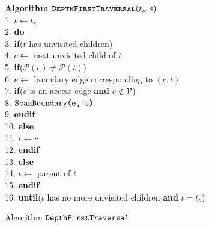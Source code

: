 {\begin{figure}[h]
{\begin{minipage}{0.90\linewidth}
  \textbf{Algorithm $\textsc{\texttt{DepthFirstTraversal}}(t_s,s)$} \\
  1. \hspace{3pt} $t \leftarrow t_s$ \\
  2. \hspace{3pt} \textbf{do} \\
  3. \hspace{18pt} \textbf{if}($t$ has unvisited children) \\
  4. \hspace{33pt} $c \leftarrow $ next unvisited child of $t$ \\
  5. \hspace{33pt} \textbf{if}($\mathcal{P}(c) \ne \mathcal{P}(t)$) \\
  6. \hspace{48pt} $e \leftarrow$ boundary edge corresponding to $(c,t)$ \\
  7. \hspace{48pt} \textbf{if}($e$ is an access edge \textbf{and} $e \notin \mathcal{V}$) \\
  8. \hspace{63pt} $\texttt{ScanBoundary(e, t)}$ \\
  9. \hspace{48pt} \textbf{endif} \\
  10. \hspace{30pt} \textbf{else} \\
  11. \hspace{45pt} $t \leftarrow c$ \\
  12. \hspace{30pt} \textbf{endif} \\
  13. \hspace{15pt} \textbf{else} \\
  14. \hspace{30pt} $t \leftarrow$ parent of $t$ \\
  15. \hspace{15pt} \textbf{endif} \\
  16. \textbf{until}($t$ has no more unvisited children \textbf{and} $t=t_s$) \\
  \end{minipage}
  }
  \caption{Algorithm $\texttt{DepthFirstTraversal}$ }
  \label{fig:traverse_graph_algorithm}
  \end{figure}

  \begin{figure}[h]
  \protect {}
\end{figure}}
